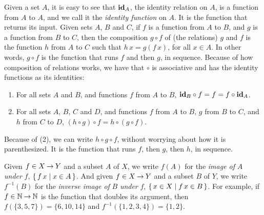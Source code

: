 Given a set $A$, it is easy to see that $\mathbf{id}_A$, the identity
relation on $A$, is a function from $A$ to $A$, and we call it
the \emph{identity function}
%
%
%
%
%
%
on $A$.  It is the function that returns its input.
Given sets $A$, $B$ and $C$, if $f$ is a function from $A$ to $B$, and
$g$ is a function from $B$ to $C$, then the composition $g\circ f$
%
%
%
%
%
%
of (the relations) $g$ and $f$ is the function $h$ from $A$ to $C$ such
that $h\,x=g(f\,x)$, for all $x\in A$.  In other words, $g\circ f$ is
the function that runs $f$ and then $g$, in sequence.  Because
of how composition of relations works, we
have that $\circ$ is associative
%
%
%
%
and has the identity functions as its identities:
\begin{enumerate}[\quad(1)]
\item For all sets $A$ and $B$, and functions $f$ from $A$ to $B$,
$\mathbf{id}_B\circ f = f = f\circ\mathbf{id}_A$.

\item For all sets $A$, $B$, $C$ and $D$, and functions
$f$ from $A$ to $B$, $g$ from $B$ to $C$, and $h$ from $C$ to $D$,
$(h\circ g)\circ f = h\circ (g\circ f)$.
\end{enumerate}
Because of (2), we can write $h\circ g\circ f$, without worrying about
how it is parenthesized.  It is the function that runs $f$, then
$g$, then $h$, in sequence.

Given $f\in X\mathbin{\to} Y$ and a subset $A$ of $X$, we write
$f(A)$ for the \emph{image of} $A$ \emph{under} $f$,
%
%
%
%
$\{ \, f\,x \mid x\in A \, \}$.  And given $f\in X\mathbin{\to} Y$ and a subset
$B$ of $Y$, we write $f^{-1}(B)$ for the \emph{inverse image of}
%
%
%
%
$B$ \emph{under} $f$, $\{ \, x\in X \mid f\,x\in B \, \}$.
For example, if $f\in\mathbb{N}\mathbin{\to}\mathbb{N}$ is the function that
doubles its argument, then $f(\{3, 5, 7\})=\{6, 10, 14\}$ and
$f^{-1}(\{1, 2, 3, 4\}) = \{1,2\}$.

